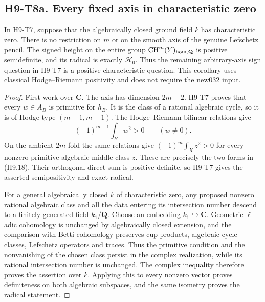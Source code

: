 \subsection*{H9-T8a. Every fixed axis in characteristic zero}

\begin{corollary}[H9-T8a]\label{h9:T8a}
In H9-T7, suppose that the algebraically closed ground field $k$
has characteristic zero. There is no restriction on $m$ or on the
smooth axis of the genuine Lefschetz pencil. The signed height on
the entire group $\operatorname{CH}^m(Y)_{\rm hom,\mathbf Q}$ is
positive semidefinite, and its radical is exactly $\mathcal H_0$.
Thus the remaining arbitrary-axis sign question in H9-T7 is a
positive-characteristic question. This corollary uses classical
Hodge--Riemann positivity and does not require the new032 input.
\end{corollary}

\begin{proof}
First work over $\mathbf C$. The axis has dimension $2m-2$.
H9-T7 proves that every $w\in A_B$ is primitive for $h_B$.
It is the class of a rational algebraic cycle, so it is of Hodge
type $(m-1,m-1)$. The Hodge--Riemann bilinear relations give
\[
             (-1)^{m-1}\int_B w^2>0\qquad(w\ne0).
\]
On the ambient $2m$-fold the same relations give
$(-1)^m\int_X z^2>0$ for every nonzero primitive algebraic
middle class $z$. These are precisely the two forms in (H9.18).
Their orthogonal direct sum is positive definite, so H9-T7 gives
the asserted semipositivity and exact radical.

For a general algebraically closed $k$ of characteristic zero,
any proposed nonzero rational algebraic class and all the data
entering its intersection number descend to a finitely generated
field $k_1/\mathbf Q$. Choose an embedding $k_1\hookrightarrow
\mathbf C$. Geometric $\ell$-adic cohomology is unchanged by
algebraically closed extension, and the comparison with Betti
cohomology preserves cup products, algebraic cycle classes,
Lefschetz operators and traces. Thus the primitive condition and
the nonvanishing of the chosen class persist in the complex
realization, while its rational intersection number is unchanged.
The complex inequality therefore proves the assertion over $k$.
Applying this to every nonzero vector proves definiteness on both
algebraic subspaces, and the same isometry proves the radical
statement.
\end{proof}


